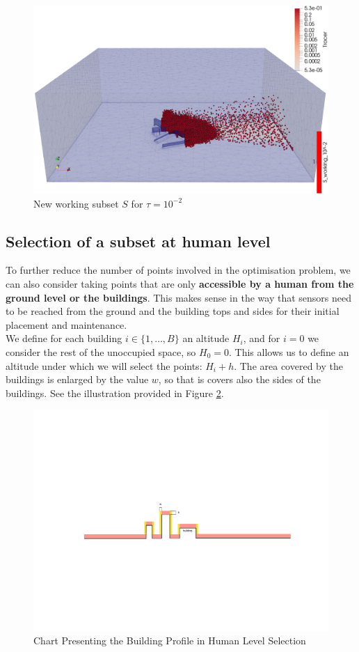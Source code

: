 \begin{figure}[h]
\centering
    \includegraphics[width = 0.8 \textwidth]{figures/Subset/working_subset_10^-2}
    \caption{New working subset $S$ for $\tau = 10^{-2}$}
    \label{fig:working_subset}
\end{figure}

\subsection{Selection of a subset at human level}

To further reduce the number of points involved in the optimisation problem, we can also consider taking points that are only \textbf{accessible by a human from the ground level or the buildings}. This makes sense in the way that sensors need to be reached from the ground and the building tops and sides for their initial placement and maintenance. \\

We define for each building $i \in \{1, \dots, B\}$ an altitude $H_i$, and for $i = 0$ we consider the rest of the unoccupied space, so $H_0 = 0$. This allows us to define an altitude under which we will select the points: $H_i + h$. The area covered by the buildings is enlarged by the value $w$, so that is covers also the sides of the buildings. See the illustration provided in Figure \ref{fig:humanchart}. \\

\begin{figure}[h]
\centering
    \includegraphics[width = 0.6 \textwidth]{figures/Subset/HumanSelection_chart}
    \caption{Chart Presenting the Building Profile in Human Level Selection}
    \label{fig:humanchart}
\end{figure}

